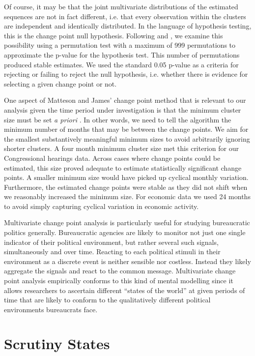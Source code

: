 \documentclass[a4paper]{article}\usepackage[]{graphicx}\usepackage[]{color}
\begin{document}
Of course, it may be that the joint multivariate distributions of the estimated sequences are not in fact different, i.e. that every observation within the clusters are independent and identically distributed. In the language of hypothesis testing, this is the change point null hypothesis. Following \cite{Matteson2014} and \cite{Rizzo2010}, we examine this possibility using a permutation test with a maximum of 999 permutations to approximate the p-value for the hypothesis test. This number of permutations produced stable estimates. We used the standard 0.05 p-value as a criteria for rejecting or failing to reject the null hypothesis, i.e. whether there is evidence for selecting a given change point or not.

One aspect of Matteson and James' change point method that is relevant to our analysis given the time period under investigation is that the minimum cluster size must be set \emph{a priori} \citeyearpar[337]{Matteson2014}. In other words, we need to tell the algorithm the minimum number of months that may be between the change points. We aim for the smallest substantively meaningful minimum sizes to avoid arbitrarily ignoring shorter clusters. A four month minimum cluster size met this criterion for our Congressional hearings data. Across cases where change points could be estimated, this size proved adequate to estimate statistically significant change points. A smaller minimum size would have picked up cyclical monthly variation. Furthermore, the estimated change points were stable as they did not shift when we reasonably increased the minimum size. For economic data we used 24 months to avoid simply capturing cyclical variation in economic activity.

Multivariate change point analysis is particularly useful for studying bureaucratic politics generally. Bureaucratic agencies are likely to monitor not just one single indicator of their political environment, but rather several such signals, simultaneously and over time. Reacting to each political stimuli in their environment as a discrete event is neither sensible nor costless. Instead they likely aggregate the signals and react to the common message. Multivariate change point analysis empirically conforms to this kind of mental modelling since it allows researchers to ascertain different ``states of the world'' at given periods of time that are likely to conform to the qualitatively different political environments bureaucrats face.

\section{Scrutiny States}
\end{document}
